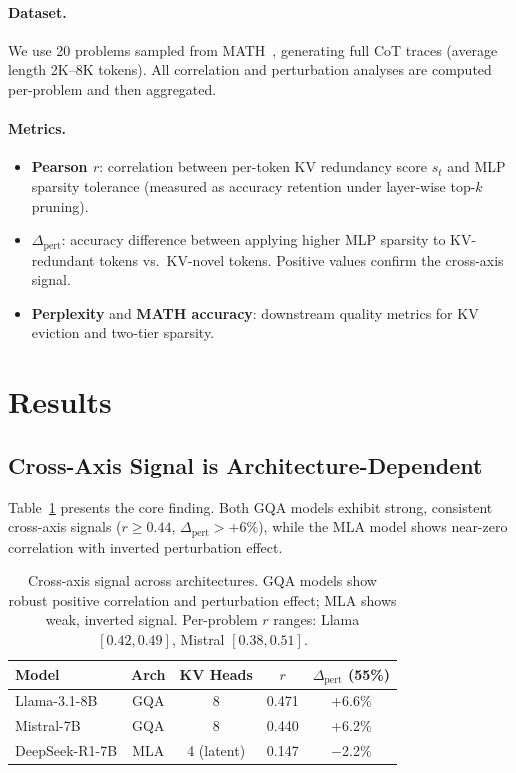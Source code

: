 \documentclass[11pt,a4paper]{article}
\begin{document}
\paragraph{Dataset.}
We use 20 problems sampled from MATH~\cite{hendrycks2021math}, generating full CoT traces (average length 2K--8K tokens).
All correlation and perturbation analyses are computed per-problem and then aggregated.

\paragraph{Metrics.}
\begin{itemize}
    \item \textbf{Pearson $r$}: correlation between per-token KV redundancy score $s_t$ and MLP sparsity tolerance (measured as accuracy retention under layer-wise top-$k$ pruning).
    \item \textbf{$\Delta_\text{pert}$}: accuracy difference between applying higher MLP sparsity to KV-redundant tokens vs.\ KV-novel tokens. Positive values confirm the cross-axis signal.
    \item \textbf{Perplexity} and \textbf{MATH accuracy}: downstream quality metrics for KV eviction and two-tier sparsity.
\end{itemize}

\section{Results}
\label{sec:results}

\subsection{Cross-Axis Signal is Architecture-Dependent}
\label{sec:main-result}

Table~\ref{tab:gqa-comparison} presents the core finding.
Both GQA models exhibit strong, consistent cross-axis signals ($r \geq 0.44$, $\Delta_\text{pert} > +6\%$), while the MLA model shows near-zero correlation with inverted perturbation effect.

\begin{table}[t]
\centering
\small
\begin{tabular}{lcccc}
\toprule
\textbf{Model} & \textbf{Arch} & \textbf{KV Heads} & \textbf{$r$} & \textbf{$\Delta_\text{pert}$ (55\%)} \\
\midrule
Llama-3.1-8B & GQA & 8 & 0.471 & +6.6\% \\
Mistral-7B   & GQA & 8 & 0.440 & +6.2\% \\
DeepSeek-R1-7B & MLA & 4 (latent) & 0.147 & $-$2.2\% \\
\bottomrule
\end{tabular}
\caption{Cross-axis signal across architectures. GQA models show robust positive correlation and perturbation effect; MLA shows weak, inverted signal. Per-problem $r$ ranges: Llama $[0.42, 0.49]$, Mistral $[0.38, 0.51]$.}
\label{tab:gqa-comparison}
\end{table}
\end{document}

